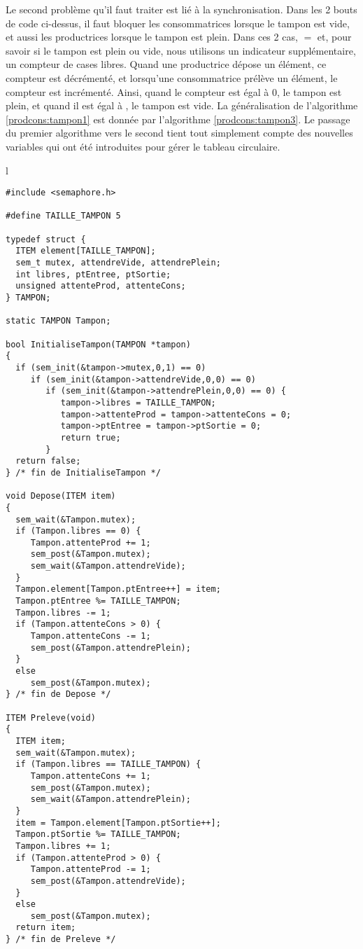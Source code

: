 Le second problème qu'il faut traiter est lié à la synchronisation. Dans les 2 bouts de code ci-dessus, il faut bloquer les consommatrices lorsque le tampon est vide, et aussi les productrices lorsque le tampon est plein. Dans ces 2 cas,  $=$  et, pour savoir si le tampon est plein ou vide, nous utilisons un indicateur supplémentaire, un compteur de cases libres. Quand une productrice dépose un élément, ce compteur est décrémenté, et lorsqu'une consommatrice prélève un élément, le compteur est incrémenté. Ainsi, quand le compteur est égal à 0, le tampon est plein, et quand il est égal à , le tampon est vide.
La généralisation de l'algorithme \ref{prodcons:tampon1} est donnée par l'algorithme \ref{prodcons:tampon3}. Le passage du premier algorithme vers le second tient tout simplement compte des nouvelles variables qui ont été introduites pour gérer le tableau circulaire.
\begin{algorithm}[!ht]
\caption{Extension de l'algorithme \ref{prodcons:tampon1}}\label{prodcons:tampon3}
\centering
\begin{tabular}{l}
\lstset{language=C++}
\begin{lstlisting}
#include <semaphore.h>

#define TAILLE_TAMPON 5

typedef struct {
  ITEM element[TAILLE_TAMPON];
  sem_t mutex, attendreVide, attendrePlein;
  int libres, ptEntree, ptSortie;
  unsigned attenteProd, attenteCons;
} TAMPON;

static TAMPON Tampon;

bool InitialiseTampon(TAMPON *tampon)
{
  if (sem_init(&tampon->mutex,0,1) == 0)
     if (sem_init(&tampon->attendreVide,0,0) == 0)
        if (sem_init(&tampon->attendrePlein,0,0) == 0) {
           tampon->libres = TAILLE_TAMPON;
           tampon->attenteProd = tampon->attenteCons = 0;
           tampon->ptEntree = tampon->ptSortie = 0;
           return true;
        }
  return false;
} /* fin de InitialiseTampon */

void Depose(ITEM item)
{
  sem_wait(&Tampon.mutex);
  if (Tampon.libres == 0) {
     Tampon.attenteProd += 1;
     sem_post(&Tampon.mutex);
     sem_wait(&Tampon.attendreVide);
  }
  Tampon.element[Tampon.ptEntree++] = item;
  Tampon.ptEntree %= TAILLE_TAMPON;
  Tampon.libres -= 1;
  if (Tampon.attenteCons > 0) {
     Tampon.attenteCons -= 1;
     sem_post(&Tampon.attendrePlein);
  }
  else
     sem_post(&Tampon.mutex);
} /* fin de Depose */

ITEM Preleve(void)
{
  ITEM item;
  sem_wait(&Tampon.mutex);
  if (Tampon.libres == TAILLE_TAMPON) {
     Tampon.attenteCons += 1;
     sem_post(&Tampon.mutex);
     sem_wait(&Tampon.attendrePlein);
  }
  item = Tampon.element[Tampon.ptSortie++];
  Tampon.ptSortie %= TAILLE_TAMPON;
  Tampon.libres += 1;
  if (Tampon.attenteProd > 0) {
     Tampon.attenteProd -= 1;
     sem_post(&Tampon.attendreVide);
  }
  else
     sem_post(&Tampon.mutex);
  return item;
} /* fin de Preleve */
\end{lstlisting}
\end{tabular}

\end{algorithm}


